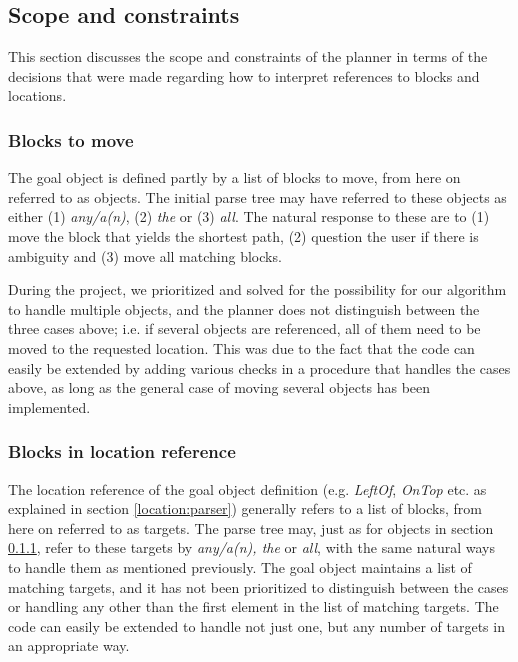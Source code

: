 \subsection{Scope and constraints}

This section discusses the scope and constraints of the planner in terms of the
decisions that were made regarding how to interpret references to blocks and
locations.

\subsubsection{Blocks to move} 
\label{sec:blockstomove}
The goal object is defined partly by a list of blocks to move, from here on
referred to as objects. The initial parse tree may have referred to these
objects as either (1) \textit{any/a(n)}, (2) \textit{the} or (3) \textit{all}.
The natural response to these are to (1) move the block that yields the shortest
path, (2) question the user if there is ambiguity and (3) move all matching
blocks.

During the project, we prioritized and solved for the possibility for our
algorithm to handle multiple objects, and the planner does not distinguish
between the three cases above; i.e. if several objects are referenced, all of
them need to be moved to the requested location. This was due to the fact that
the code can easily be extended by adding various checks in a procedure that
handles the cases above, as long as the general case of moving several objects
has been implemented.

\subsubsection{Blocks in location reference}

The location reference of the goal object definition (e.g. \textit{LeftOf},
\textit{OnTop} etc. as explained in section \ref{location:parser}) generally
refers to a list of blocks, from here on referred to as targets. The parse tree
may, just as for objects in section \ref{sec:blockstomove}, refer to these
targets by \textit{any/a(n), the} or \textit{all}, with the same natural ways to
handle them as mentioned previously. The goal object maintains a list of
matching targets, and it has not been prioritized to distinguish between the
cases or handling any other than the first element in the list of matching
targets. The code can easily be extended to handle not just one, but any number
of targets in an appropriate way.

